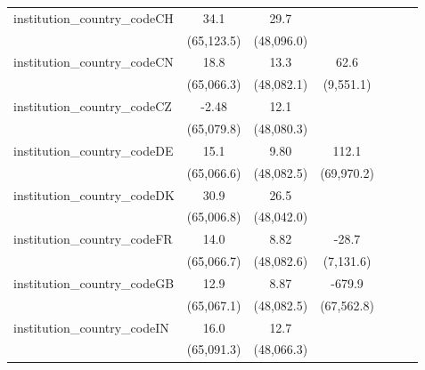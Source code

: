 \begin{tabular}{lcccccc}
   institution\_country\_codeCH          & 34.1         & 29.7         &              &               &            &   \\   
                                         & (65,123.5)   & (48,096.0)   &              &               &            &   \\   
   institution\_country\_codeCN          & 18.8         & 13.3         & 62.6         &               &            &   \\   
                                         & (65,066.3)   & (48,082.1)   & (9,551.1)    &               &            &   \\   
   institution\_country\_codeCZ          & -2.48        & 12.1         &              &               &            &   \\   
                                         & (65,079.8)   & (48,080.3)   &              &               &            &   \\   
   institution\_country\_codeDE          & 15.1         & 9.80         & 112.1        &               &            &   \\   
                                         & (65,066.6)   & (48,082.5)   & (69,970.2)   &               &            &   \\   
   institution\_country\_codeDK          & 30.9         & 26.5         &              &               &            &   \\   
                                         & (65,006.8)   & (48,042.0)   &              &               &            &   \\   
   institution\_country\_codeFR          & 14.0         & 8.82         & -28.7        &               &            &   \\   
                                         & (65,066.7)   & (48,082.6)   & (7,131.6)    &               &            &   \\   
   institution\_country\_codeGB          & 12.9         & 8.87         & -679.9       &               &            &   \\   
                                         & (65,067.1)   & (48,082.5)   & (67,562.8)   &               &            &   \\   
   institution\_country\_codeIN          & 16.0         & 12.7         &              &               &            &   \\   
                                         & (65,091.3)   & (48,066.3)   &              &               &            &   \\   

\end{tabular}

